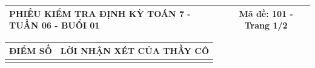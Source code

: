 \documentclass[12pt,a4paper]{article}
\begin{document}
\pagestyle{empty}

\noindent
\begin{tabularx}{\linewidth}{|X|c|}
\hline
\textbf{PHIẾU KIỂM TRA ĐỊNH KỲ TOÁN 7 - TUẦN 06 - BUỔI 01} & \textbf{Mã đề: 101 - Trang 1/2} \\
\hline
\end{tabularx}

\vspace{1.0mm}

\noindent
\begin{tabularx}{\linewidth}{|p{3.2cm}|X|}
\hline
\centering\textbf{ĐIỂM SỐ} & \centering\textbf{LỜI NHẬN XÉT CỦA THẦY CÔ} \tabularnewline
\hline
\rule{0pt}{1.8cm} & \tabularnewline
\hline
\end{tabularx}
\end{document}
